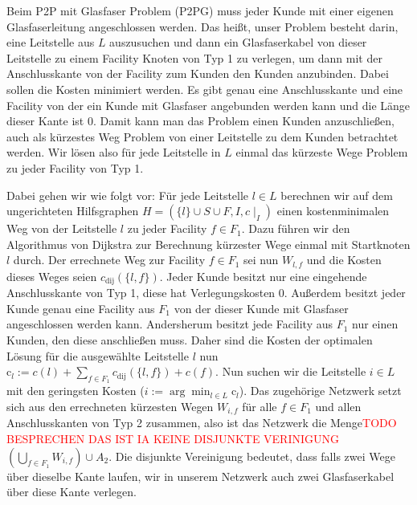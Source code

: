 \documentclass[11pt,a4paper]{article}
\theoremstyle{my_th_style1}
\begin{document}
Beim P2P mit Glasfaser Problem (P2PG) muss jeder Kunde mit einer eigenen Glasfaserleitung angeschlossen werden.
Das heißt, unser Problem besteht darin, eine Leitstelle aus $L$ auszusuchen und dann ein Glasfaserkabel von dieser Leitstelle zu einem Facility Knoten von Typ 1 zu verlegen, um dann mit der Anschlusskante von der Facility zum Kunden den Kunden anzubinden.
Dabei sollen die Kosten minimiert werden.
Es gibt genau eine Anschlusskante und eine Facility von der ein Kunde mit Glasfaser angebunden werden kann und die Länge dieser Kante ist 0.
Damit kann man das Problem einen Kunden anzuschließen, auch als kürzestes Weg Problem von einer Leitstelle zu dem Kunden betrachtet werden.
Wir lösen also für jede Leitstelle in $L$ einmal das kürzeste Wege Problem zu jeder Facility von Typ 1.

Dabei gehen wir wie folgt vor:
Für jede Leitstelle $ l \in L$ berechnen wir auf dem ungerichteten Hilfsgraphen $H=(\{l\} \cup S \cup F , I,c\mid_I)$ einen kostenminimalen Weg von der Leitstelle $l$ zu jeder Facility $f \in F_1$. Dazu führen wir den Algorithmus von Dijkstra zur Berechnung k\"urzester Wege einmal mit Startknoten $l$ durch.
Der errechnete Weg zur Facility \( f \in F_1\) sei nun $W_{l,f}$ und die Kosten dieses Weges seien $c_{\text{dij}}(\{l,f\})$. 
Jeder Kunde besitzt nur eine eingehende Anschlusskante von Typ 1, diese hat Verlegungskosten 0. 
Außerdem besitzt jeder Kunde genau eine Facility aus $F_1$ von der dieser Kunde mit Glasfaser angeschlossen werden kann. 
Andersherum besitzt jede Facility aus $F_1$ nur einen Kunden, den diese anschließen muss. 
Daher sind die Kosten der optimalen Lösung für die ausgewählte Leitstelle $l$ nun $\text{c}_l:=c(l) + \displaystyle\sum_{f \in F_1} c_{\text{dij}}(\{l,f\}) + c(f)$. 
Nun suchen wir die Leitstelle $i \in L$ mit den geringsten Kosten ($i:=\arg \displaystyle\min_{l \in L} \text{c}_l$). Das zugehörige Netzwerk setzt sich aus den errechneten kürzesten Wegen $W_{i,f}$ für alle $f \in F_1$ und allen Anschlusskanten von Typ 2 zusammen, also ist das Netzwerk die Menge\textcolor{red}{TODO BESPRECHEN DAS IST IA KEINE DISJUNKTE VERINIGUNG} $(\bigcup_{f \in F_1 }W_{i,f}) \cup A_2 $. Die disjunkte Vereinigung bedeutet, dass falls zwei Wege über dieselbe Kante laufen, wir in unserem Netzwerk auch zwei Glasfaserkabel über diese Kante verlegen.
\end{document}
